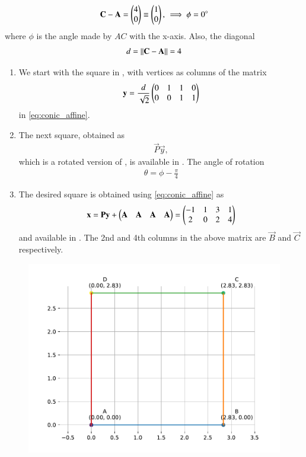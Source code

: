\begin{align}
\mathbf{C} - \mathbf{A} = \begin{pmatrix}
4\\
0
\end{pmatrix} \equiv 
\begin{pmatrix}
1\\
0
\end{pmatrix},\,
\implies \phi= 0\degree
\end{align}
		where
$\phi$ is the angle made by $AC$ with the x-axis.
Also, the diagonal
\begin{align}
	d = \left\lVert\mathbf{C}-\mathbf{A}\right\rVert = 4
\end{align}
\begin{enumerate}
	\item We start with  the square in ,
 with vertices as columns of the matrix
\begin{align}
	\mathbf{y} = \frac{d}{\sqrt 2}\begin{pmatrix}0 & 1 & 1 & 0 \\ 0 & 0 & 1 & 1\end{pmatrix}
\end{align}
	in \eqref{eq:conic_affine}.
\item The next square, obtained as 
\begin{align}
\vec{P}\vec{y},
\end{align}
which is a rotated version of 
,
is available in 
.  The angle of rotation
\begin{align}
	\theta = \phi - \frac{\pi}{4}
\end{align}
\item The desired square  is obtained using
\eqref{eq:conic_affine} as
\begin{align}
	\mathbf{x}=\mathbf{P}\mathbf{y} + \begin{pmatrix}\mathbf{A} & \mathbf{A} &\mathbf{A} &\mathbf{A}\end{pmatrix} = 
		\begin{pmatrix}
-1  &1 & 3 & 1 \\
2 & 0 & 2 & 4
	\end{pmatrix}
\end{align}
and available in 
. The 2nd and 4th columns in the above matrix are 
$\vec{B}$ and $\vec{C}$ respectively.
\end{enumerate}
\begin{figure}[H]
	\begin{center} 
	    \includegraphics[width=0.75\columnwidth]{chapters/10/7/4/4/figs/fig.pdf}
	\end{center}
\caption{}
\label{fig:7/4/4/4Fig3}
\end{figure}
